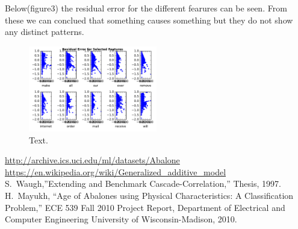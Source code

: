 \documentclass[10pt, paper=a4]{article}
\begin{document}
Below(figure3) the residual error for the different fearures can
be seen. From these we can conclued that something causes something
but they do not show any distinct patterns.



\begin{figure}[h]
  \centering
  \includegraphics[width = 0.5\textwidth]{../../src/img/residual_error.pdf}
  \caption{Text.}
  \label{fig:gam}
\end{figure}



\begin{thebibliography}{10}
 \url{http://archive.ics.uci.edu/ml/datasets/Abalone}
 \url{https://en.wikipedia.org/wiki/Generalized_additive_model}
 S.~Waugh,''Extending and Benchmark
  Cascade-Correlation,'' Thesis, 1997.
 H.~Mayukh, ``Age of Abalones using Physical
  Characteristics: A Classification Problem,'' ECE 539 Fall 2010
  Project Report, Department of Electrical and Computer Engineering
  University of Wisconsin-Madison, 2010.
\end{thebibliography}
\end{document}
